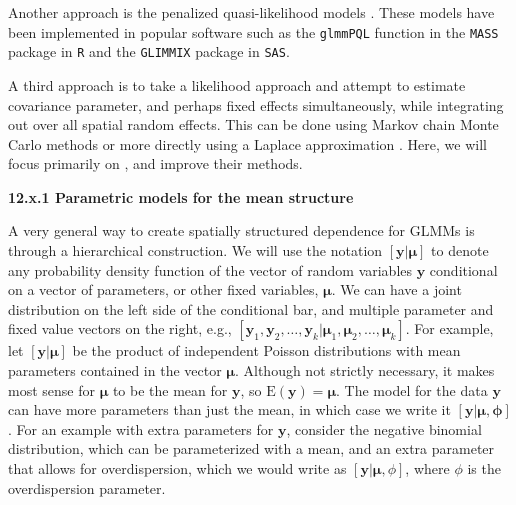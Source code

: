 \documentclass[12pt, titlepage]{article}
\begin{document}
Another approach is the penalized quasi-likelihood models \citep{breslow_approximate_1993, WolfingerEtAl1993GeneralizedLinearMixed233}.  These models have been implemented in popular software such as the \texttt{glmmPQL} function in the \texttt{MASS} package in \texttt{R} and the \texttt{GLIMMIX} package in \texttt{SAS}.

A third approach is to take a likelihood approach and attempt to estimate covariance parameter, and perhaps fixed effects simultaneously, while integrating out over all spatial random effects.   This can be done using Markov chain Monte Carlo methods \citep[e.g.,][]{christensen_monte_2004} or more directly using a Laplace approximation \citep[e.g.,][]{evangelou_estimation_2011, bonat_practical_2016}.  Here, we will focus primarily on \citet{bonat_practical_2016}, and improve their methods.




{\large \flushleft \textbf{12.x.1 Parametric models for the mean structure}}

A very general way to create spatially structured dependence for GLMMs is through a hierarchical construction.  We will use the notation $[\mathbf{y}|\boldsymbol{\mu}]$ to denote any probability density function of the vector of random variables $\mathbf{y}$ conditional on a vector of parameters, or other fixed variables, $\boldsymbol{\mu}$. We can have a joint distribution on the left side of the conditional bar, and multiple parameter and fixed value vectors on the right, e.g., $[\mathbf{y}_{1},\mathbf{y}_{2}, \ldots, \mathbf{y}_{k} | \boldsymbol{\mu}_{1}, \boldsymbol{\mu}_{2}, \ldots, \boldsymbol{\mu}_{k}]$. For example, let $[\mathbf{y}|\boldsymbol{\mu}]$ be the product of independent Poisson distributions with mean parameters contained in the vector $\boldsymbol{\mu}$.  Although not strictly necessary, it makes most sense for $\boldsymbol{\mu}$ to be the mean for $\mathbf{y}$, so $\textrm{E}(\mathbf{y}) = \boldsymbol{\mu}$. The model for the data $\mathbf{y}$ can have more parameters than just the mean, in which case we write it $[\mathbf{y}|\boldsymbol{\mu},\boldsymbol{\phi}]$. For an example with extra parameters for $\mathbf{y}$, consider the negative binomial distribution, which can be parameterized with a mean, and an extra parameter that allows for overdispersion, which we would write as $[\mathbf{y}|\boldsymbol{\mu},\phi]$, where $\phi$ is the overdispersion parameter.
\end{document}
